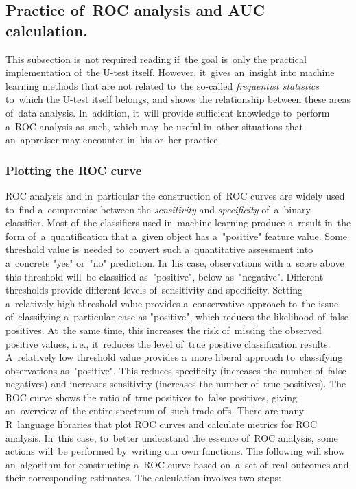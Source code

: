 \documentclass[]{scrreprt}
\begin{document}
\subsection{Practice of~ROC analysis and AUC calculation.}\label{ROC-AUC-theory}
This subsection is~not required reading if~the goal is~only the practical implementation of~the U-test itself. However, it~gives an~insight into machine learning methods that are not related to~the so-called \emph{frequentist statistics} to~which the U-test itself belongs, and shows the relationship between these areas of~data analysis. In~addition, it~will provide sufficient knowledge to~perform a~ROC analysis as~such, which may~be useful in~other situations that an~appraiser may encounter in~his or~her practice.
%
\subsubsection{Plotting the ROC curve}\label{plot-ROC-theory}
%
%
ROC analysis and in~particular the construction of~ROC curves are widely used to~find a~compromise between the \emph{sensitivity} and \emph{specificity} of~a~binary classifier. Most of~the classifiers used in~machine learning produce a~result in~the form of~a~quantification that a~given object has a~"positive" feature value. Some threshold value is~needed to~convert such a~quantitative assessment into a~concrete "yes" or~"no" prediction. In~his case, observations with a~score above this threshold will~be classified as~"positive", below as~"negative". Different thresholds provide different levels of~sensitivity and specificity. Setting a~relatively high threshold value provides a~conservative approach to~the issue of~classifying a~particular case as "positive", which reduces the likelihood of~false positives. At~the same time, this increases the risk of~missing the observed positive values, i.\,e., it~reduces the level of~true positive classification results. A~relatively low threshold value provides a~more liberal approach to~classifying observations as~"positive".  This reduces specificity (increases the number of~false negatives) and increases sensitivity (increases the number of~true positives). The ROC curve shows the ratio of~true positives to~false positives, giving an~overview of~the entire spectrum of~such trade-offs. There are many R~language libraries that plot ROC curves and calculate metrics for ROC analysis. In~this case, to~better understand the essence of~ROC analysis, some actions will~be performed by~writing our own functions. The following will show an~algorithm for constructing a~ROC curve based on~a~set of~real outcomes and their corresponding estimates. The calculation involves two steps:
\end{document}
